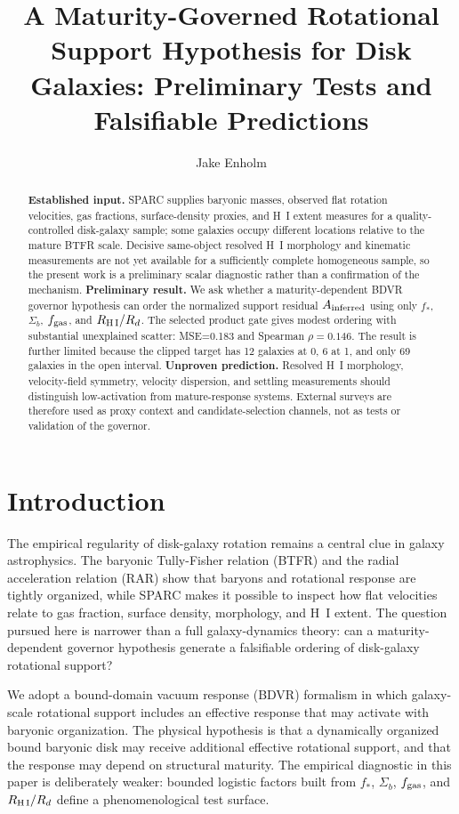 \documentclass[11pt]{article}
\title{A Maturity-Governed Rotational Support Hypothesis for Disk Galaxies: Preliminary Tests and Falsifiable Predictions}
\author{Jake Enholm}
\date{}
\begin{document}
\maketitle

\begin{abstract}
\textbf{Established input.} SPARC supplies baryonic masses, observed flat rotation velocities, gas fractions, surface-density proxies, and H~I extent measures for a quality-controlled disk-galaxy sample; some galaxies occupy different locations relative to the mature BTFR scale. Decisive same-object resolved H~I morphology and kinematic measurements are not yet available for a sufficiently complete homogeneous sample, so the present work is a preliminary scalar diagnostic rather than a confirmation of the mechanism. \textbf{Preliminary result.} We ask whether a maturity-dependent BDVR governor hypothesis can order the normalized support residual $A_{\rm inferred}$ using only $f_*$, $\Sigma_b$, $f_{\rm gas}$, and $R_{\rm H\,I}/R_d$. The selected product gate gives modest ordering with substantial unexplained scatter: MSE=0.183 and Spearman $\rho=0.146$. The result is further limited because the clipped target has 12 galaxies at 0, 6 at 1, and only 69 galaxies in the open interval. \textbf{Unproven prediction.} Resolved H~I morphology, velocity-field symmetry, velocity dispersion, and settling measurements should distinguish low-activation from mature-response systems. External surveys are therefore used as proxy context and candidate-selection channels, not as tests or validation of the governor.
\end{abstract}

\section{Introduction}

The empirical regularity of disk-galaxy rotation remains a central clue in galaxy astrophysics. The baryonic Tully-Fisher relation (BTFR) and the radial acceleration relation (RAR) show that baryons and rotational response are tightly organized, while SPARC makes it possible to inspect how flat velocities relate to gas fraction, surface density, morphology, and H~I extent. The question pursued here is narrower than a full galaxy-dynamics theory: can a maturity-dependent governor hypothesis generate a falsifiable ordering of disk-galaxy rotational support?

We adopt a bound-domain vacuum response (BDVR) formalism in which galaxy-scale rotational support includes an effective response that may activate with baryonic organization. The physical hypothesis is that a dynamically organized bound baryonic disk may receive additional effective rotational support, and that the response may depend on structural maturity. The empirical diagnostic in this paper is deliberately weaker: bounded logistic factors built from $f_*$, $\Sigma_b$, $f_{\rm gas}$, and $R_{\rm H\,I}/R_d$ define a phenomenological test surface.
\end{document}
